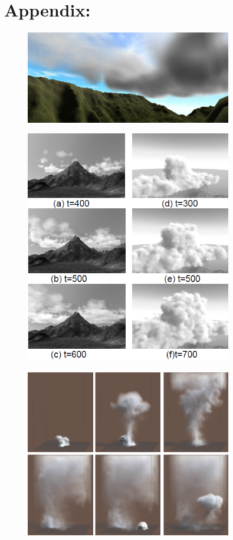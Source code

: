 {}
\addtocounter{section}{1}
\section*{Appendix:}
\begin{figure}[ht!]
	\centering
	\includegraphics[width=90mm]{images/Simulation_of_Cloud_Dynamics_on_Graphics_Hardware_2.PNG}
	\caption{\citet{HarrisEtAl03}}
	\label{fig:Simulation_of_Cloud_Dynamics_on_Graphics_Hardware_2}
\end{figure}
\begin{figure}[ht!]
	
	\centering
	\includegraphics[width=90mm]{images/A_Method_for_Modeling_Clouds_based_on_Atmospheric_Fluid_Dynamics.PNG}
	\caption{\citet{Miyazaki01}}
	\label{fig:A_Method_for_Modeling_Clouds_based_on_Atmospheric_Fluid_Dynamics}
\end{figure}
\begin{figure}[ht!]
	\centering
	\includegraphics[width=90mm]{images/Visual_Simulation_of_Smoke.PNG}
	\caption{\citet*{Fedkiw01}}
	\label{fig:Visual_Simulation_of_Smoke}
\end{figure}

